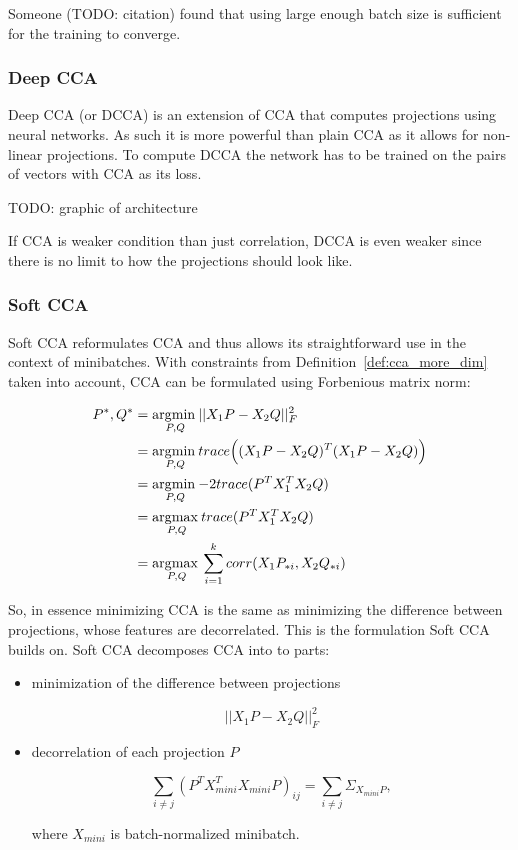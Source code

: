 Someone (TODO: citation) found that using large enough batch size is sufficient
for the training to converge.

\subsubsection{Deep CCA}

Deep CCA (or DCCA) is an extension of CCA that computes projections using
neural networks. As such it is more powerful than plain CCA as it allows for
non-linear projections. To compute DCCA the network has to be trained on the
pairs of vectors with CCA as its loss.

TODO: graphic of architecture

If CCA is weaker condition than just correlation, DCCA is even weaker since
there is no limit to how the projections should look like.

\subsubsection{Soft CCA}

Soft CCA reformulates CCA and thus allows its straightforward use in the
context of minibatches. With constraints from Definition~\ref{def:cca_more_dim}
taken into account, CCA can be formulated using Forbenious matrix norm:

\begin{align}
  P^\ast, Q^\ast &= \underset{P, Q}{\operatorname*{\arg\!\min\medspace}} ||X_1P - X_2Q||^2_F \\
  &= \underset{P, Q}{\operatorname*{\arg\!\min\medspace}} trace\Big((X_1P - X_2Q)^T(X_1P - X_2Q)\Big) \\
  &= \underset{P, Q}{\operatorname*{\arg\!\min\medspace}} {-2} trace(P^TX_1^TX_2Q) \\
  &= \underset{P, Q}{\operatorname*{\arg\!\max\medspace}} trace(P^TX_1^TX_2Q) \\
  &= \underset{P, Q}{\operatorname*{\arg\!\max\medspace}} \sum_{i = 1}^k corr(X_1P_{*i}, X_2Q_{*i})
\end{align}

So, in essence minimizing CCA is the same as minimizing the difference between
projections, whose features are decorrelated. This is the formulation Soft CCA
builds on. Soft CCA decomposes CCA into to parts:

\begin{itemize}
  \item minimization of the difference between projections

    \begin{equation}
      ||X_1P - X_2Q||^2_F
    \end{equation}

  \item decorrelation of each projection $P$

    \begin{equation}
      \sum_{i \ne j} (P^TX^T_{mini}X_{mini}P)_{ij} = \sum_{i \ne j} \Sigma_{X_{mini}P},
    \end{equation}

    where $X_{mini}$ is batch-normalized minibatch.

\end{itemize}

